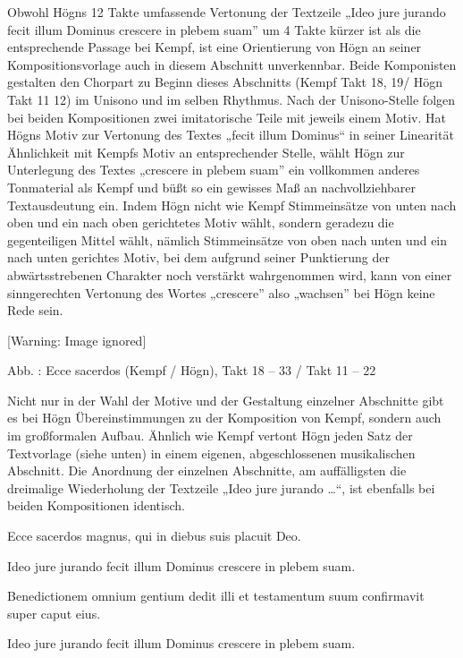 \documentclass[a4paper]{article}
\newcounter{Abb}
\renewcommand\theAbb{\arabic{Abb}}
\begin{document}
Obwohl Högns 12 Takte umfassende Vertonung der Textzeile „Ideo jure
jurando fecit illum Dominus crescere in plebem suam” um 4 Takte kürzer
ist als die entsprechende Passage bei Kempf, ist eine Orientierung von
Högn an seiner Kompositionsvorlage auch in diesem Abschnitt
unverkennbar. Beide Komponisten gestalten den Chorpart zu Beginn dieses
Abschnitts (Kempf Takt 18, 19/ Högn Takt 11 12) im Unisono und im
selben Rhythmus. Nach der Unisono-Stelle folgen bei beiden
Kompositionen zwei imitatorische Teile mit jeweils einem Motiv. Hat
Högns Motiv zur Vertonung des Textes „fecit illum Dominus“ in seiner
Linearität Ähnlichkeit mit Kempfs Motiv an entsprechender Stelle, wählt
Högn zur Unterlegung des Textes „crescere in plebem suam” ein
vollkommen anderes Tonmaterial als Kempf und büßt so ein gewisses Maß
an nachvollziehbarer Textausdeutung ein. Indem Högn nicht wie Kempf
Stimmeinsätze von unten nach oben und ein nach oben gerichtetes Motiv
wählt, sondern geradezu die gegenteiligen Mittel wählt, nämlich
Stimmeinsätze von oben nach unten und ein nach unten gerichtes Motiv,
bei dem aufgrund seiner Punktierung der abwärtsstrebenen Charakter noch
verstärkt wahrgenommen wird, kann von einer sinngerechten Vertonung des
Wortes „crescere” also „wachsen” bei Högn keine Rede sein.

  [Warning: Image ignored] %
 

Abb. \stepcounter{Abb}{\theAbb}: Ecce sacerdos (Kempf / Högn), Takt 18 –
 33 / Takt 11 –  22

Nicht nur in der Wahl der Motive und der Gestaltung einzelner Abschnitte
gibt es bei Högn Übereinstimmungen zu der Komposition von Kempf,
sondern auch im großformalen Aufbau. Ähnlich wie Kempf vertont Högn
jeden Satz der Textvorlage (siehe unten) in einem eigenen,
abgeschlossenen musikalischen Abschnitt. Die Anordnung der einzelnen
Abschnitte, am auffälligsten die dreimalige Wiederholung der Textzeile
„Ideo jure jurando …“, ist ebenfalls bei beiden Kompositionen
identisch.

Ecce sacerdos magnus, qui in diebus suis placuit Deo.

Ideo jure jurando fecit illum Dominus crescere in plebem suam.

Benedictionem omnium gentium dedit illi et testamentum suum confirmavit
super caput eius.

Ideo jure jurando fecit illum Dominus crescere in plebem suam.
\end{document}
